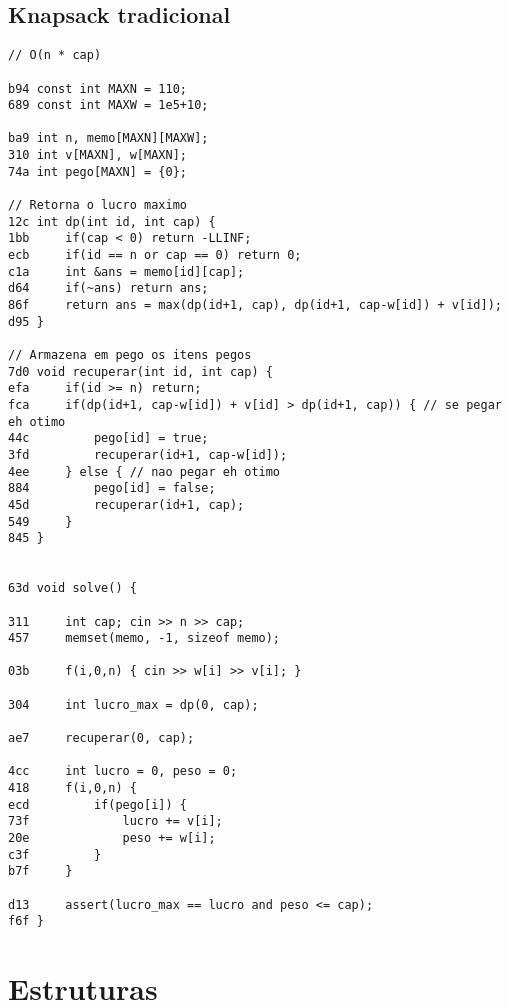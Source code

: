 \documentclass[11pt, a4paper, twoside]{article}
\begin{document}
\subsection{Knapsack tradicional}
\begin{lstlisting}
// O(n * cap)

b94 const int MAXN = 110;
689 const int MAXW = 1e5+10;

ba9 int n, memo[MAXN][MAXW];
310 int v[MAXN], w[MAXN];
74a int pego[MAXN] = {0};

// Retorna o lucro maximo 
12c int dp(int id, int cap) {
1bb 	if(cap < 0) return -LLINF;
ecb 	if(id == n or cap == 0) return 0;
c1a 	int &ans = memo[id][cap];
d64 	if(~ans) return ans;
86f 	return ans = max(dp(id+1, cap), dp(id+1, cap-w[id]) + v[id]);
d95 }

// Armazena em pego os itens pegos 
7d0 void recuperar(int id, int cap) {
efa 	if(id >= n) return;
fca 	if(dp(id+1, cap-w[id]) + v[id] > dp(id+1, cap)) { // se pegar eh otimo
44c 		pego[id] = true;
3fd 		recuperar(id+1, cap-w[id]);
4ee 	} else { // nao pegar eh otimo
884 		pego[id] = false;
45d 		recuperar(id+1, cap);
549 	}
845 }


63d void solve() {
    
311 	int cap; cin >> n >> cap;
457 	memset(memo, -1, sizeof memo);
    
03b 	f(i,0,n) { cin >> w[i] >> v[i]; }
    
304 	int lucro_max = dp(0, cap);
    
ae7 	recuperar(0, cap);
    	
4cc 	int lucro = 0, peso = 0;
418 	f(i,0,n) {
ecd 		if(pego[i]) {
73f 			lucro += v[i];
20e 			peso += w[i];
c3f 		}
b7f 	}
    	
d13 	assert(lucro_max == lucro and peso <= cap);
f6f }
\end{lstlisting}



%
%

\section{Estruturas}
\end{document}
